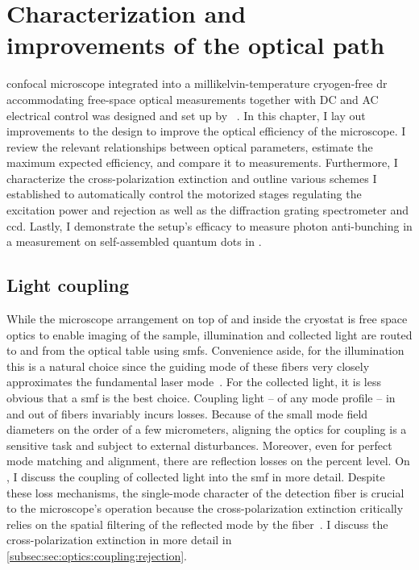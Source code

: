 \chapter{Characterization and improvements of the optical path}\label{ch:setup:optics}
 confocal microscope integrated into a millikelvin-temperature cryogen-free \gls{dr} accommodating free-space optical measurements together with DC and AC electrical control was designed and set up by \citeauthor{Descamps2024}~\cite{Descamps2021,Descamps2024}.
In this chapter, I lay out improvements to the design to improve the optical efficiency of the microscope.
I review the relevant relationships between optical parameters, estimate the maximum expected efficiency, and compare it to measurements.
Furthermore, I characterize the cross-polarization extinction and outline various schemes I established to automatically control the motorized stages regulating the excitation power and rejection as well as the diffraction grating spectrometer and \gls{ccd}.
Lastly, I demonstrate the setup's efficacy to measure photon anti-bunching in a  measurement on self-assembled quantum dots in .

\section{Light coupling}\label{sec:setup:optics:coupling}
While the microscope arrangement on top of and inside the cryostat is free space optics to enable imaging of the sample, illumination and collected light are routed to and from the optical table using \glspl{smf}.
Convenience aside, for the illumination this is a natural choice since the guiding mode of these fibers very closely approximates the fundamental  laser mode~\cite{Kowalevicz2006}.
For the collected light, it is less obvious that a \gls{smf} is the best choice.
Coupling light -- of any mode profile -- in and out of fibers invariably incurs losses.
Because of the small mode field diameters on the order of a few micrometers, aligning the optics for coupling is a sensitive task and subject to external disturbances.
Moreover, even for perfect mode matching and alignment, there are reflection losses on the percent level.
On , I discuss the coupling of collected light into the \gls{smf} in more detail.
Despite these loss mechanisms, the single-mode character of the detection fiber is crucial to the microscope's operation because the cross-polarization extinction critically relies on the spatial filtering of the reflected mode by the fiber~\cite{Benelajla2021,Steindl2023}.
I discuss the cross-polarization extinction in more detail in \cref{subsec:sec:optics:coupling:rejection}.

